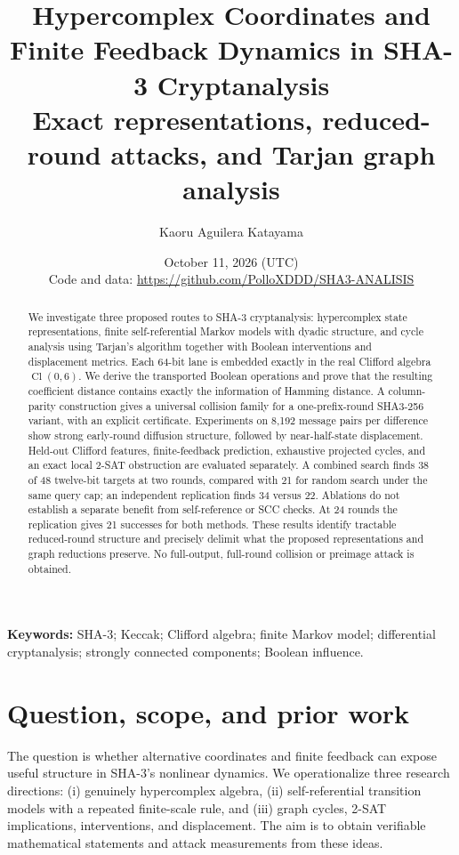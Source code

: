 \documentclass[11pt]{article}
\title{\textbf{Hypercomplex Coordinates and Finite Feedback Dynamics in SHA-3 Cryptanalysis}\\[0.45em]
\large Exact representations, reduced-round attacks, and Tarjan graph analysis}
\author{Kaoru Aguilera Katayama}
\date{October 11, 2026 (UTC)\\
\small Code and data: \url{https://github.com/PolloXDDD/SHA3-ANALISIS}}
\newcommand{\Cl}{\operatorname{Cl}}
\begin{document}
\maketitle
\begin{abstract}
We investigate three proposed routes to SHA-3 cryptanalysis: hypercomplex state representations, finite self-referential Markov models with dyadic structure, and cycle analysis using Tarjan's algorithm together with Boolean interventions and displacement metrics. Each 64-bit lane is embedded exactly in the real Clifford algebra $\Cl(0,6)$. We derive the transported Boolean operations and prove that the resulting coefficient distance contains exactly the information of Hamming distance. A column-parity construction gives a universal collision family for a one-prefix-round SHA3-256 variant, with an explicit certificate. Experiments on 8,192 message pairs per difference show strong early-round diffusion structure, followed by near-half-state displacement. Held-out Clifford features, finite-feedback prediction, exhaustive projected cycles, and an exact local 2-SAT obstruction are evaluated separately. A combined search finds 38 of 48 twelve-bit targets at two rounds, compared with 21 for random search under the same query cap; an independent replication finds 34 versus 22. Ablations do not establish a separate benefit from self-reference or SCC checks. At 24 rounds the replication gives 21 successes for both methods. These results identify tractable reduced-round structure and precisely delimit what the proposed representations and graph reductions preserve. No full-output, full-round collision or preimage attack is obtained.
\end{abstract}

\noindent\textbf{Keywords:} SHA-3; Keccak; Clifford algebra; finite Markov model; differential cryptanalysis; strongly connected components; Boolean influence.

\section{Question, scope, and prior work}

The question is whether alternative coordinates and finite feedback can expose useful structure in SHA-3's nonlinear dynamics. We operationalize three research directions: (i) genuinely hypercomplex algebra, (ii) self-referential transition models with a repeated finite-scale rule, and (iii) graph cycles, 2-SAT implications, interventions, and displacement. The aim is to obtain verifiable mathematical statements and attack measurements from these ideas.
\end{document}
